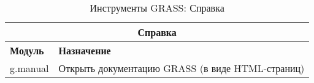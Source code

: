 {\renewcommand{\arraystretch}{0.7}
\begin{table}[H]
\centering
 \begin{tabular}{|p{4cm}|p{10cm}|}
  \hline \multicolumn{2}{|c|}{\textbf{Справка}} \\
  \hline \textbf{Модуль} & \textbf{Назначение} \\
  \hline g.manual & Открыть документацию GRASS (в виде HTML-страниц) \\
\hline
\end{tabular}
\caption{Инструменты GRASS: Справка}
\end{table}}

